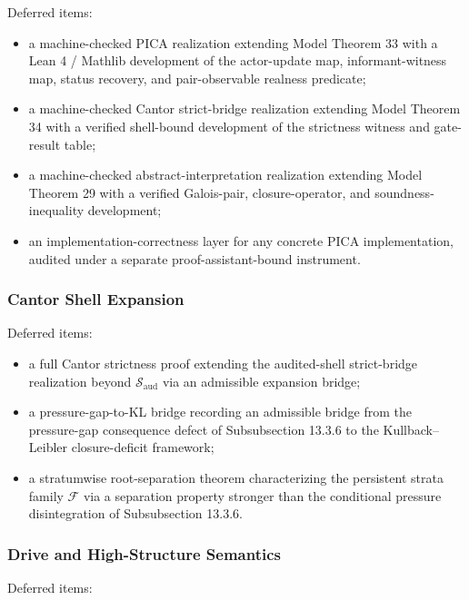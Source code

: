 \documentclass[11pt]{article}
\providecommand{\tightlist}{}
\theoremstyle{definition}
\begin{document}
Deferred items:

\begin{itemize}
\tightlist
\item
  a machine-checked PICA realization extending Model Theorem 33 with a Lean 4 / Mathlib development of the actor-update map, informant-witness map, status recovery, and pair-observable realness predicate;
\item
  a machine-checked Cantor strict-bridge realization extending Model Theorem 34 with a verified shell-bound development of the strictness witness and gate-result table;
\item
  a machine-checked abstract-interpretation realization extending Model Theorem 29 with a verified Galois-pair, closure-operator, and soundness-inequality development;
\item
  an implementation-correctness layer for any concrete PICA implementation, audited under a separate proof-assistant-bound instrument.
\end{itemize}

\subsubsection{Cantor Shell Expansion}

Deferred items:

\begin{itemize}
\tightlist
\item
  a full Cantor strictness proof extending the audited-shell strict-bridge realization beyond \(\mathcal S_{\mathrm{aud}}\) via an admissible expansion bridge;
\item
  a pressure-gap-to-KL bridge recording an admissible bridge from the pressure-gap consequence defect of Subsubsection 13.3.6 to the Kullback--Leibler closure-deficit framework;
\item
  a stratumwise root-separation theorem characterizing the persistent strata family \(\mathcal F\) via a separation property stronger than the conditional pressure disintegration of Subsubsection 13.3.6.
\end{itemize}

\subsubsection{Drive and High-Structure Semantics}

Deferred items:
\end{document}
